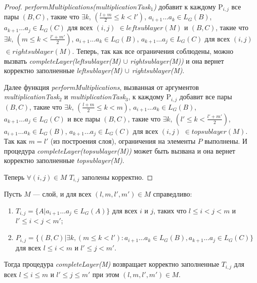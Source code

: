 \begin{proof}

\textit{performMultiplications(multiplicationTask$_1$)} добавит к каждому P$_{i,j}$ все пары
$(B, C)$, такие что $\exists k$, $(\frac{l+m}{2} \le k < l')$, $a_{i + 1} \dots a_{k} \in L_{G}(B)$, $a_{k + 1} \dots a_{j} \in L_{G}(C)$ для всех $(i, j)$ $\in leftsublayer(M)$
и
$(B, C)$, такие что $\exists k$, $(m \le k < \frac{l'+m'}{2})$, $a_{i + 1} \dots a_{k} \in L_{G}(B)$, $a_{k + 1} \dots a_{j} \in L_{G}(C)$ для всех $(i, j)$ $\in rightsublayer(M)$.
Теперь, так как все ограничения соблюдены, можно вызвать \textit{completeLayer(leftsublayer(M) $\cup$ rightsublayer(M))} и она вернет корректно заполненные \textit{leftsublayer(M) $\cup$ rightsublayer(M)}.

Далее функция \textit{performMultiplications}, вызванная от аргументов
\textit{multiplicationTask$_2$} и \textit{multiplicationTask$_3$}, к каждому P$_{i,j}$ добавит все пары
$(B, C)$, такие что $\exists k$, $(\frac{l+m}{2} \le k < m)$, $a_{i + 1} \dots a_{k} \in L_{G}(B)$, $a_{k + 1} \dots a_{j} \in L_{G}(C)$
и все пары
$(B, C)$, такие что $\exists k$, $(l' \le k < \frac{l'+m'}{2})$, $a_{i + 1} \dots a_{k} \in L_{G}(B)$, $a_{k + 1} \dots a_{j} \in L_{G}(C)$
для всех $(i, j)$ $\in topsublayer(M)$.
Так как $m = l'$ (из построения слоя), ограничения на элементы $P$ выполнены.
И процедура \textit{completeLayer(topsublayer(M))} может быть вызвана и она вернет корректно заполненные \textit{topsublayer(M)}.

Теперь $\forall (i, j) \in M$ $T_{i, j}$ заполены корректно.

\end{proof}

\begin{theorem}
Пусть $M$ --- слой, и для всех $(l, m, l', m') \in M$ справедливо:
\begin{enumerate}
  \item $T_{i, j} = \{ A |  a_{i + 1} \dots a_{j} \in L_G(A)\}$ для всех $i$ и $j$, таких что $l \leq i < j < m$ и $l' \leq i < j < m'$;
  \item $P_{i, j} =  \{ (B, C) |\exists k, (m \le k < l'): a_{i + 1} \dots a_{k} \in L_G(B), a_{k + 1} \dots a_{j} \in L_G(C)\}$ для всех $l \leq i < m$ и $l' \leq j < m'$.
\end{enumerate}

Тогда процедура \textit{completeLayer(M)} возвращает корректно заполненные $T_{i, j}$ для всех $l \leq i \le m$ и $l' \leq j \le m'$ при этом $(l, m, l', m') \in M$.
\end{theorem}


